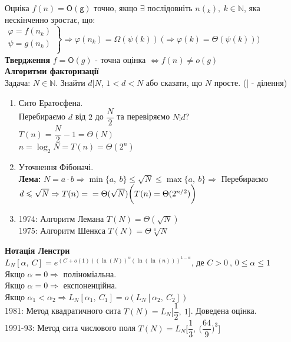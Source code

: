 \documentclass[a4paper,12pt]{article}
\begin{document}
    Оцніка $f(n)=\mathsf{O(g)}$ точно, якщо $\exists$ послідовніть $n(_k),\:k\in\mathbb{N}$,
    яка нескінченно зростає, що:
    $\left.
        \begin{array}{ccc}
            \varphi=f(n_k) \\
            \psi=g(n_k)   \\
        \end{array}
    \right\}\Rightarrow\varphi(n_k)=\Omega(\psi(k))\: \biggl(\Rightarrow\varphi(k)=\Theta(\psi(k))\biggr)$ \\
    \textbf{Твердження} $f=\mathsf{O}(g)$ - точна оцінка $\Leftrightarrow f(n)\ne o(g)$ \\
    
\newpage
    \textbf{Алгоритми факторизації} \\
    Задача: $N\in\mathbb{N}$. Знайти $d|N$, $1<d<N$ або  сказати, що $N$ просте. (| - ділення)\\
    \begin{enumerate}
        \item Сито Ератосфена. \\
        Перебираємо $d$ від $2$ до $\dfrac{N}{2}$ та перевіряємо $N\vdots d$? \\
        $T(n)=\dfrac{N}{2}-1=\Theta(N)$ \\
        $n=\log_2N=T(n)=\Theta(2^n)$
        \item Уточнення Фібоначі. \\
        \textbf{Лема:} $N=a\cdot b\Rightarrow\min\{a,\:b\}\leqslant\sqrt{N}\leqslant\max\{a,\:b\}\Rightarrow$ 
        Перебираємо $d\leqslant\sqrt{N}\Rightarrow T(n)=\\=\Theta(\sqrt{N}) \biggl(T(n)=\Theta(2^{n/2})\biggr)$
        \item 1974: Алгоритм Лемана $T(N)=\Theta(\sqrt{N})$ \\
        1975: Алгоритм Шенкса $T(N)=\Theta\sqrt[4]{N}$
    \end{enumerate}
    \textbf{Нотація Ленстри} \\
    $L_N[\alpha,\:C]=e^{(C+o(1))(\ln(N))^\alpha(\ln(\ln(n)))^{1-\alpha}}$, де $C>0\:$, $0\leqslant\alpha\leqslant1$ \\
    Якщо $\alpha=0\Rightarrow$ поліноміальна. \\
    Якщо $\alpha=0\Rightarrow$ експоненційна. \\
    Якщо $\alpha_1<\alpha_2\Rightarrow L_N[\alpha_1,\:C_1]=o(L_N[\alpha_2,\:C_2])$ \\
    1981: Метод квадратичного сита $T(N)=L_N\biggl[\dfrac{1}{2},\:1\biggr]$. Доведена оцінка. \\
    1991-93: Метод сита числового поля $T(N)=L_N\biggl[\dfrac{1}{3},\:\biggl(\dfrac{64}{9}\biggr)^3\biggr]$
\end{document}
